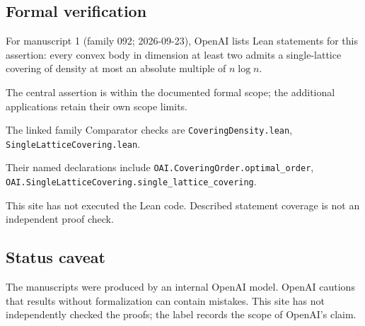 \documentclass[11pt]{article}
\begin{document}
\subsection{Formal verification}
For manuscript 1 (family 092; 2026-09-23), OpenAI lists Lean statements for this assertion: every convex body in dimension at least two admits a single-lattice covering of density at most an absolute multiple of $n\log n$.

The central assertion is within the documented formal scope; the additional applications retain their own scope limits.

The linked family Comparator checks are \texttt{CoveringDensity.lean}, \texttt{SingleLatticeCovering.lean}.

Their named declarations include \texttt{OAI.CoveringOrder.optimal\_order}, \texttt{OAI.SingleLatticeCovering.single\_lattice\_covering}.

This site has not executed the Lean code. Described statement coverage is not an independent proof check.

\subsection{Status caveat}
The manuscripts were produced by an internal OpenAI model. OpenAI cautions that results without formalization can contain mistakes. This site has not independently checked the proofs; the label records the scope of OpenAI's claim.
\end{document}
